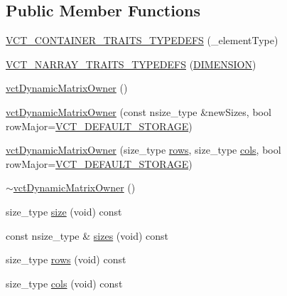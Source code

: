 \subsection*{Public Member Functions}
\begin{DoxyCompactItemize}
\item 
\hyperlink{classvct_dynamic_matrix_owner_a11538431d608a6ba8d1431547fb77b1d}{V\-C\-T\-\_\-\-C\-O\-N\-T\-A\-I\-N\-E\-R\-\_\-\-T\-R\-A\-I\-T\-S\-\_\-\-T\-Y\-P\-E\-D\-E\-F\-S} (\-\_\-element\-Type)
\item 
\hyperlink{classvct_dynamic_matrix_owner_a226011482d7ac8a28db6c06b08e3ee50}{V\-C\-T\-\_\-\-N\-A\-R\-R\-A\-Y\-\_\-\-T\-R\-A\-I\-T\-S\-\_\-\-T\-Y\-P\-E\-D\-E\-F\-S} (\hyperlink{classvct_dynamic_matrix_owner_ab539c6209377e71938f3be5a0f73aa90a3cbd1d8cbd91b8e603c01551869fb839}{D\-I\-M\-E\-N\-S\-I\-O\-N})
\item 
\hyperlink{classvct_dynamic_matrix_owner_a760d3b528cdf268fa0d6ce118396b5d8}{vct\-Dynamic\-Matrix\-Owner} ()
\item 
\hyperlink{classvct_dynamic_matrix_owner_a7bd36798c8b00b5dd7f1f2c05c15fc43}{vct\-Dynamic\-Matrix\-Owner} (const nsize\-\_\-type \&new\-Sizes, bool row\-Major=\hyperlink{vct_forward_declarations_8h_aacdb3b0140beef8a3c2025b808b74a73}{V\-C\-T\-\_\-\-D\-E\-F\-A\-U\-L\-T\-\_\-\-S\-T\-O\-R\-A\-G\-E})
\item 
\hyperlink{classvct_dynamic_matrix_owner_a7b008ac9387bc143138c8c70ef99bda1}{vct\-Dynamic\-Matrix\-Owner} (size\-\_\-type \hyperlink{classvct_dynamic_matrix_owner_acbdac2c17cafa939c90536ab43a83ae6}{rows}, size\-\_\-type \hyperlink{classvct_dynamic_matrix_owner_a39b183ecd47dcfb5ca6957e390e39c4a}{cols}, bool row\-Major=\hyperlink{vct_forward_declarations_8h_aacdb3b0140beef8a3c2025b808b74a73}{V\-C\-T\-\_\-\-D\-E\-F\-A\-U\-L\-T\-\_\-\-S\-T\-O\-R\-A\-G\-E})
\item 
\hyperlink{classvct_dynamic_matrix_owner_a38e7fafdc1f6bde17bde0ba888f45faf}{$\sim$vct\-Dynamic\-Matrix\-Owner} ()
\item 
size\-\_\-type \hyperlink{classvct_dynamic_matrix_owner_ad39f338c34ca4aa991e0919ffda110a3}{size} (void) const 
\item 
const nsize\-\_\-type \& \hyperlink{classvct_dynamic_matrix_owner_ad1f9518f9d47c15b6b405453efe4631c}{sizes} (void) const 
\item 
size\-\_\-type \hyperlink{classvct_dynamic_matrix_owner_acbdac2c17cafa939c90536ab43a83ae6}{rows} (void) const 
\item 
size\-\_\-type \hyperlink{classvct_dynamic_matrix_owner_a39b183ecd47dcfb5ca6957e390e39c4a}{cols} (void) const 

\end{DoxyCompactItemize}
